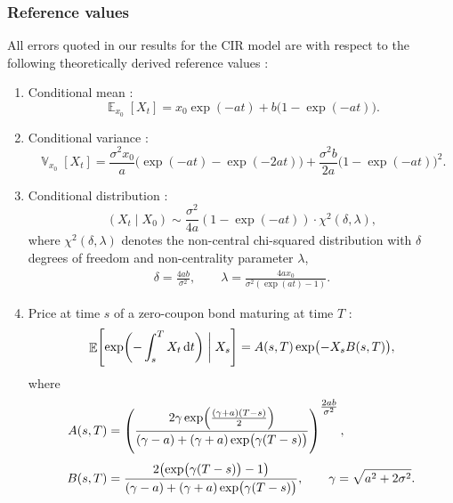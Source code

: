 \documentclass[11pt, letterpaper]{article}
\theoremstyle{definition}
\theoremstyle{remark}
\DeclareMathOperator{\E}{\mathbb{E}}
\DeclareMathOperator{\V}{\mathbb{V}}
\newcommand{\diff}{\mathop{}\!\mathrm{d}}
\begin{document}
\begin{appendices}
\subsubsection*{Reference values}
All errors quoted in our results for the CIR model are with respect to the following theoretically derived reference values \cite{cox1985cir, feller1951diffusion}:
\begin{enumerate}
    \item Conditional mean \cite{cox1985cir}:
    \begin{equation}
        \E_{x_0}[X_t] = x_0 \exp(-a t) + b \bigl(1 - \exp(-at)\bigr).
    \end{equation}
    \item Conditional variance \cite{cox1985cir}:
    \begin{equation}
        \V_{x_0}[X_t] = \frac{\sigma^2 x_0}{a} \bigl(\exp(-at) - \exp(-2a t)\bigr)  + \frac{\sigma^2 b}{2a} \bigl(1 - \exp(-at)\bigr)^2.
    \end{equation}
    \item Conditional distribution \cite{cox1985cir}:
    \begin{equation}
            (X_t \mid X_0) \sim  \dfrac{\sigma^2}{4 a} (1 - \exp(-a t))  \cdot \chi^2(\delta, \lambda),
    \end{equation}
    where $\chi^2(\delta, \lambda)$ denotes the non-central chi-squared distribution with $\delta$ degrees of freedom and non-centrality parameter $\lambda$,
    \begin{align*}
        \delta = \frac{4 a b}{\sigma^{2}},\qquad \lambda = \frac{4 a x_0}{\sigma^{2}(\exp(a t) - 1)}.
    \end{align*}
    \item Price at time $s$ of a zero-coupon bond maturing at time $T$ \cite{cox1985cir}: \begin{equation}
        \E\Biggl[\exp\biggl(-\int_s^T X_t \diff t\biggr)\biggm| X_s\Biggr] = A(s, T) \exp\bigl(-X_s B(s, T)\bigr),
    \end{equation}
    where
    \begin{align*}
            A(s, T) &= \left( \frac{2 \gamma \exp\Bigl(\frac{(\gamma + a)(T - s)}{2}\Bigr)}{(\gamma - a) + (\gamma + a) \exp\bigl(\gamma (T - s)\bigr)} \right)^{\tfrac{2ab}{\sigma^2}},\\[3pt]
            B(s, T) &= \frac{2\bigl(\exp\bigl(\gamma (T-s)\bigr) - 1\bigr)}{(\gamma - a) + (\gamma + a) \exp\bigl(\gamma (T - s)\bigr)},\qquad
            \gamma = \sqrt{a^2 + 2\sigma^2}.
    \end{align*}
\end{enumerate}


\end{appendices}
\end{document}
